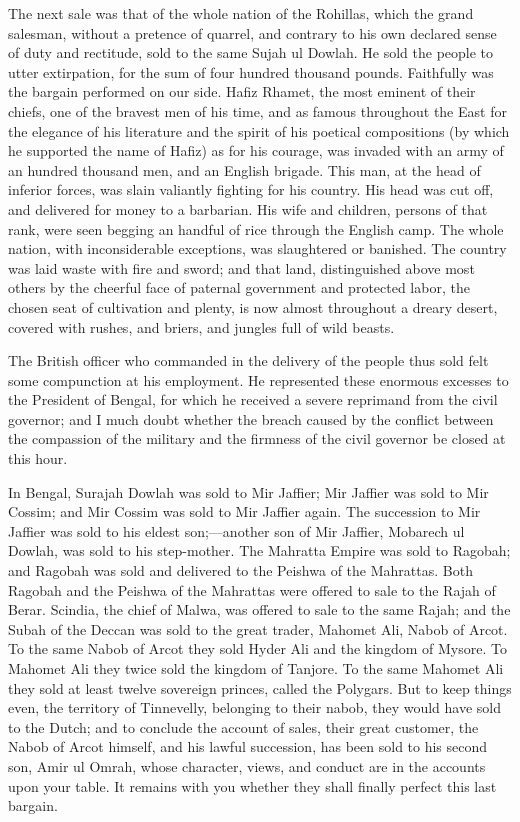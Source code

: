 The next sale was that of the whole nation of the Rohillas, which the grand salesman, without a pretence of quarrel, and contrary to his own declared sense of duty and rectitude, sold to the same Sujah ul Dowlah. He sold the people to utter extirpation, for the sum of four hundred thousand pounds. Faithfully was the bargain performed on our side. Hafiz Rhamet, the most eminent of their chiefs, one of the bravest men of his time, and as famous throughout the East for the elegance of his literature and the spirit of his poetical compositions (by which he supported the name of Hafiz) as for his courage, was invaded with an army of an hundred thousand men, and an English brigade. This man, at the head of inferior forces, was slain valiantly fighting for his country. His head was cut off, and delivered for money to a barbarian. His wife and children, persons of that rank, were seen begging an handful of rice through the English camp. The whole nation, with inconsiderable exceptions, was slaughtered or banished. The country was laid waste with fire and sword; and that land, distinguished above most others by the cheerful face of paternal government and protected labor, the chosen seat of cultivation and plenty, is now almost throughout a dreary desert, covered with rushes, and briers, and jungles full of wild beasts.

The British officer who commanded in the delivery of the people thus sold felt some compunction at his employment. He represented these enormous excesses to the President of Bengal, for which he received a severe reprimand from the civil governor; and I much doubt whether the breach caused by the conflict between the compassion of the military and the firmness of the civil governor be closed at this hour.

In Bengal, Surajah Dowlah was sold to Mir Jaffier; Mir Jaffier was sold to Mir Cossim; and Mir Cossim was sold to Mir Jaffier again. The succession to Mir Jaffier was sold to his eldest son;—another son of Mir Jaffier, Mobarech ul Dowlah, was sold to his step-mother. The Mahratta Empire was sold to Ragobah; and Ragobah was sold and delivered to the Peishwa of the Mahrattas. Both Ragobah and the Peishwa of the Mahrattas were offered to sale to the Rajah of Berar. Scindia, the chief of Malwa, was offered to sale to the same Rajah; and the Subah of the Deccan was sold to the great trader, Mahomet Ali, Nabob of Arcot. To the same Nabob of Arcot they sold Hyder Ali and the kingdom of Mysore. To Mahomet Ali they twice sold the kingdom of Tanjore. To the same Mahomet Ali they sold at least twelve sovereign princes, called the Polygars. But to keep things even, the territory of Tinnevelly, belonging to their nabob, they would have sold to the Dutch; and to conclude the account of sales, their great customer, the Nabob of Arcot himself, and his lawful succession, has been sold to his second son, Amir ul Omrah, whose character, views, and conduct are in the accounts upon your table. It remains with you whether they shall finally perfect this last bargain.

